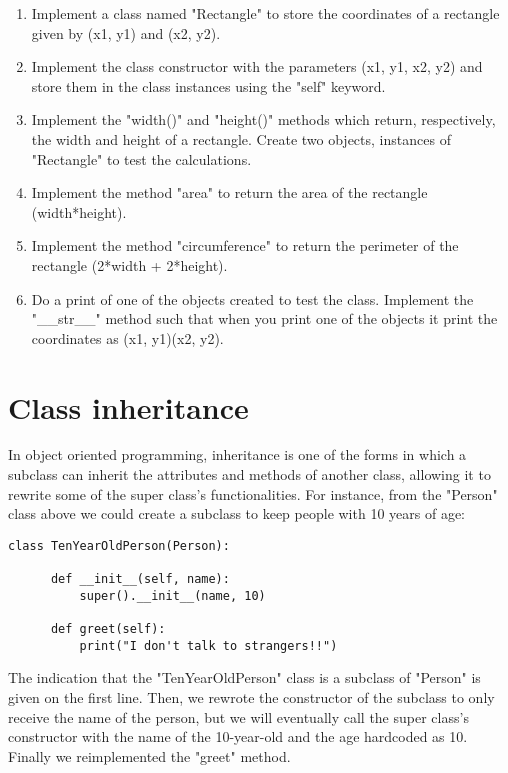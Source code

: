 \begin{enumerate}

\item Implement a class named "Rectangle" to store the coordinates of a rectangle given by (x1, y1) and (x2, y2).

\item Implement the class constructor with the parameters (x1, y1, x2, y2) and store them in the class instances using the "self" keyword.

\item Implement the "width()" and "height()" methods which return, respectively, the width and height of a rectangle. Create two objects, instances of "Rectangle" to test the calculations.

\item Implement the method "area" to return the area of the rectangle (width*height).

\item Implement the method "circumference" to return the perimeter of the rectangle (2*width + 2*height).

\item Do a print of one of the objects created to test the class. Implement the "\_\_str\_\_" method such that when you print one of the objects it print the coordinates as (x1, y1)(x2, y2).

\end{enumerate}

\section{Class inheritance}

In object oriented programming, inheritance is one of the forms in which a subclass can inherit the attributes and methods of another class, allowing it to rewrite some of the super class's functionalities. For instance, from the "Person" class above we could create a subclass to keep people with 10 years of age:

\begin{lstlisting}
class TenYearOldPerson(Person):

      def __init__(self, name):
          super().__init__(name, 10)
          
      def greet(self):
          print("I don't talk to strangers!!")
\end{lstlisting}

The indication that the "TenYearOldPerson" class is a subclass of "Person" is given on the first line. Then, we rewrote the constructor of the subclass to only receive the name of the person, but we will eventually call the super class's constructor with the name of the 10-year-old and the age hardcoded as 10. Finally we reimplemented the "greet" method.

